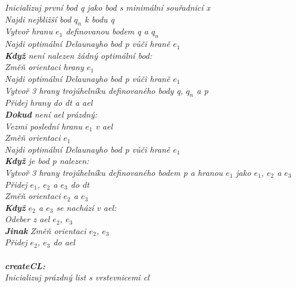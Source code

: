 \documentclass{article}
\begin{document}
\indent\textit{Inicializuj první bod q jako bod s minimální souřadnicí x}\\
\indent\textit{Najdi nejbližší bod $q_{n}$ k bodu q}\\
\indent\textit{Vytvoř hranu $e_{1}$ definovanou bodem q a $q_{n}$}\\
\indent\textit{Najdi optimální Delaunayho bod p vůči hraně $e_{1}$}\\
\indent\textit{\textbf{Když} není nalezen žádný optimální bod:}\\
\indent\indent\textit{Změň orientaci hrany $e_{1}$}\\
\indent\indent\textit{Najdi optimální Delaunayho bod p vůči hraně $e_{1}$}\\
\indent\textit{Vytvoř 3 hrany trojúhelníku definovaného body q, $q_{n}$ a p}\\
\indent\textit{Přidej hrany do dt a ael}\\
\indent\textit{\textbf{Dokud} není ael prázdný:}\\
\indent\indent\textit{Vezmi poslední hranu $e_{1}$ v ael}\\
\indent\indent\textit{Změň orientaci $e_{1}$}\\
\indent\indent\textit{Najdi optimální Delaunayho bod p vůči hraně $e_{1}$}\\
\indent\indent\textit{\textbf{Když} je bod p nalezen:}\\
\indent\indent\indent\textit{Vytvoř 3 hrany trojúhelníku definovaného bodem p a hranou $e_{1}$ jako $e_{1}$, $e_{2}$ a $e_{3}$}\\
\indent\indent\indent\textit{Přidej $e_{1}$, $e_{2}$ a $e_{3}$ do dt}\\
\indent\indent\indent\textit{Změň orientaci $e_{2}$ a $e_{3}$}\\
\indent\indent\indent\textit{\textbf{Když} $e_{2}$ a $e_{3}$ se nachází v ael:}\\
\indent\indent\indent\indent\textit{Odeber z ael $e_{2}$, $e_{3}$}\\
\indent\indent\indent\textit{\textbf{Jinak}}
\indent\indent\indent\indent\textit{Změň orientaci $e_{2}$, $e_{3}$}\\
\indent\indent\indent\indent\textit{Přidej $e_{2}$, $e_{3}$ do ael}\\
\vspace{0.2cm}\\
\indent\textit{\textbf{createCL:}}\\
\indent\textit{Inicializuj prázdný list s vrstevnicemi cl}\\
\end{document}
